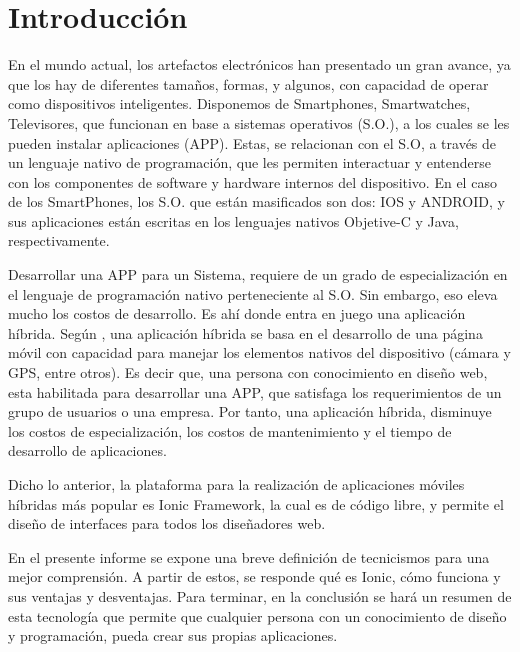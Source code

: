 \section{Introducción}
\parindent=5mm

En el mundo actual, los artefactos electrónicos han presentado un gran avance, ya que los hay de diferentes tamaños, formas, y algunos, con capacidad de operar como dispositivos inteligentes. Disponemos de Smartphones, Smartwatches, Televisores, que funcionan en base a sistemas operativos (S.O.), a los cuales se les pueden instalar aplicaciones (APP). Estas, se relacionan con el S.O, a través de un lenguaje nativo de programación, que les permiten interactuar y entenderse con los componentes de software y hardware internos del dispositivo. En el caso de los SmartPhones, los S.O. que están masificados son dos: IOS y ANDROID, y sus aplicaciones están escritas en los lenguajes nativos Objetive-C y Java, respectivamente.

Desarrollar una APP para un Sistema, requiere de un grado de especialización en el lenguaje de programación nativo perteneciente al S.O. Sin embargo, eso eleva mucho los costos de desarrollo. Es ahí donde entra en juego una aplicación híbrida. Según \citet{angulo}, una aplicación híbrida se basa en el desarrollo de una página móvil con capacidad para manejar los elementos nativos del dispositivo (cámara y GPS, entre otros). Es decir que, una persona con conocimiento en diseño web, esta habilitada para desarrollar una APP, que satisfaga los requerimientos de un grupo de usuarios o una empresa. Por tanto, una aplicación híbrida, disminuye los costos de especialización, los costos de mantenimiento y el tiempo de desarrollo de aplicaciones. 

Dicho lo anterior, la plataforma para la realización de aplicaciones móviles híbridas más popular es Ionic Framework, la cual es de código libre, y permite el diseño de interfaces para todos los diseñadores web.

En el presente informe se expone una breve definición de tecnicismos para una mejor comprensión. A partir de estos, se responde qué es Ionic, cómo funciona y sus ventajas y desventajas. Para terminar, en la conclusión se hará un resumen de esta tecnología que permite que cualquier persona con un conocimiento de diseño y programación, pueda crear sus propias aplicaciones.
